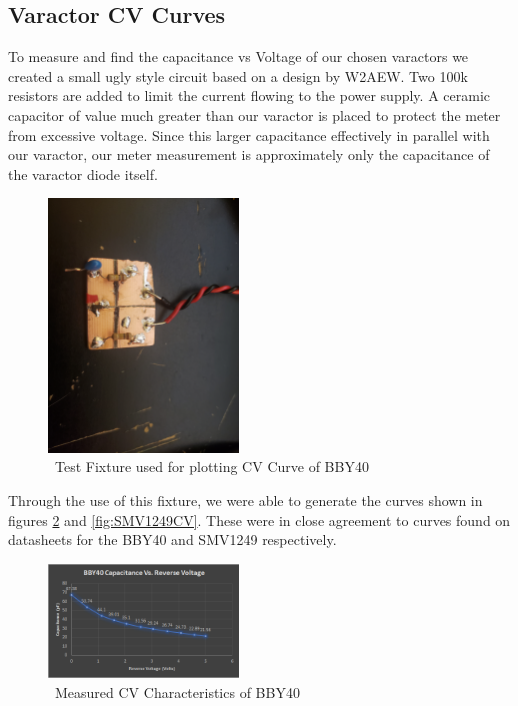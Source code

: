 \documentclass[journal]{IEEEtran} \usepackage[english]{babel}
\begin{document}
\subsection{Varactor CV Curves}\label{subsec:CVCurves}

To measure and find the capacitance vs Voltage of our chosen varactors we
created a small ugly style circuit based on a design by W2AEW. Two 100k
resistors are added to limit the current flowing to the power supply. A ceramic
capacitor of value much greater than our varactor is placed to protect the meter
from excessive voltage. Since this larger capacitance effectively in
parallel with our varactor, our meter measurement is approximately only the
capacitance of the varactor diode itself.

\begin{figure}[htb]
\centering
\includegraphics[width=0.45\textwidth]{BBY40_capacitance_testfixture}
\caption{\ Test Fixture used for plotting CV Curve of BBY40
}\label{fig:CVTestFixt}
\end{figure}



Through the use of this fixture, we were able to generate the curves shown in
figures \ref{fig:BBY40CV} and \ref{fig:SMV1249CV}. These were in close agreement
to curves found on datasheets for the BBY40 and SMV1249 respectively.
 
\begin{figure}[htb]
\centering
\includegraphics[width=0.45\textwidth]{bbY40CV}
\caption{\ Measured CV Characteristics of BBY40 
}\label{fig:BBY40CV}
\end{figure}
 
\end{document}
